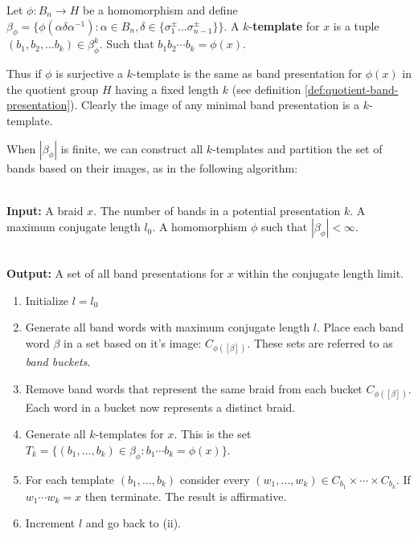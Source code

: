 \documentclass[12pt]{thesis}
\begin{document}
\begin{definition}
     Let $\phi \colon B_{n} \rightarrow H$ be a homomorphism
     and define $\beta_{\phi} = \{ \phi(\alpha \delta \alpha^{-1}) \colon \alpha \in B_{n}, \delta \in \{\sigma_{1}^{\pm} \ldots \sigma_{n-1}^{\pm} \} \}$.
     A $k$-\textbf{template} for $x$ 
     is a tuple $(b_{1}, b_{2}, \ldots b_{k}) \in \beta_{\phi}^{k}$.
     Such that $b_{1}b_{2} \cdots b_{k} = \phi(x)$.
\end{definition}

Thus if $\phi$ is surjective
a $k$-template is the same as band presentation for $\phi(x)$ in the quotient
group $H$ having a fixed length $k$ (see definition \ref{def:quotient-band-presentation}).
Clearly the image of any minimal band presentation is a $k$-template.

When $|\beta_{\phi}|$ is finite, we can construct all $k$-templates
and partition the set of bands based on their images,
as in the following algorithm:

\begin{algorithm}
    \label{alg:templated-search}
    ~\\
    \textbf{Input:} A braid $x$.
                    The number of bands in a potential presentation $k$.
                    A maximum conjugate length $l_{0}$.
                    A homomorphism $\phi$ such that $|\beta_{\phi}| < \infty$.

    ~\\
    \textbf{Output:} A set of all band presentations for $x$ within the conjugate length limit. 

    \begin{enumerate}
        \item Initialize $l = l_{0}$
        \item Generate all band words with maximum conjugate length $l$.
            Place each band word $\beta$ in a set based on it's image: $C_{\phi([\beta])}$.
            These sets are referred to as \textit{band buckets}.

        \item Remove band words that represent the same braid from each bucket $C_{\phi([\beta])}$.
              Each word in a bucket now represents a distinct braid.

        \item Generate all $k$-templates for $x$.
            This is the set $T_{k} = \{ (b_{1}, \ldots, b_{k}) \in \beta_{\phi} \colon b_{1} \cdots b_{k} = \phi(x) \}$.

        \item For each template $(b_{1}, \ldots, b_{k})$
            consider every $(w_{1}, \ldots, w_{k}) \in C_{b_{1}} \times \cdots \times C_{b_{k}}$.
            If $w_{1} \cdots w_{k} = x$
            then terminate. The result is affirmative.

        \item Increment $l$ and go back to (ii).
    \end{enumerate}
\end{algorithm}
\end{document}
